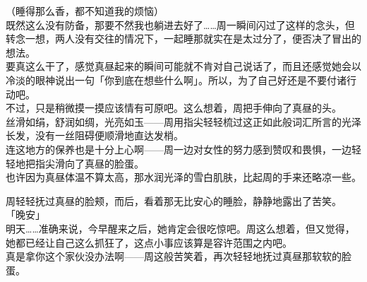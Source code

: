 （睡得那么香，都不知道我的烦恼）\\

既然这么没有防备，那要不然我也躺进去好了……周一瞬间闪过了这样的念头，但转念一想，两人没有交往的情况下，一起睡那就实在是太过分了，便否决了冒出的想法。\\

要真这么干了，感觉真昼起来的瞬间可能就不肯对自己说话了，而且还感觉她会以冷淡的眼神说出一句「你到底在想些什么啊」。所以，为了自己好还是不要付诸行动吧。\\

不过，只是稍微摸一摸应该情有可原吧。这么想着，周把手伸向了真昼的头。\\

丝滑如绢，舒润如绸，光亮如玉——周用指尖轻轻梳过这正如此般词汇所言的光泽长发，没有一丝阻碍便顺滑地直达发梢。\\

连这地方的保养也是十分上心啊——周一边对女性的努力感到赞叹和畏惧，一边轻轻地把指尖滑向了真昼的脸蛋。\\

也许因为真昼体温不算太高，那水润光泽的雪白肌肤，比起周的手来还略凉一些。

周轻轻抚过真昼的脸颊，而后，看着那无比安心的睡脸，静静地露出了苦笑。\\

「晚安」\\

明天……准确来说，今早醒来之后，她肯定会很吃惊吧。周这么想着，但又觉得，她都已经让自己这么抓狂了，这点小事应该算是容许范围之内吧。\\

真是拿你这个家伙没办法啊——周这般苦笑着，再次轻轻地抚过真昼那软软的脸蛋。\\
